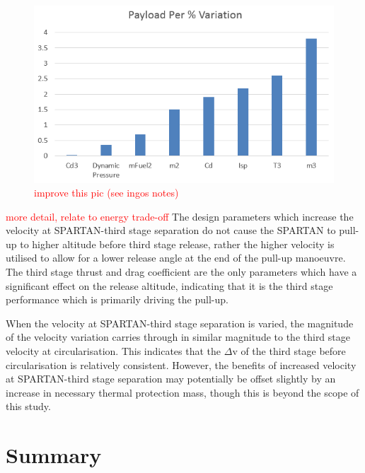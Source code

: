 \begin{figure}[ht!]
\centering
\includegraphics[width=0.7\linewidth]{figures/5_Ascent/BarChartRelativePayloadChange}
\caption{\textcolor{red}{improve this pic (see ingos notes)}}
\label{fig:BarChartRelativePayloadChange}
\end{figure}


\textcolor{red}{more detail, relate to energy trade-off}
The design parameters which increase the velocity at SPARTAN-third stage separation do not cause the SPARTAN to pull-up to higher altitude before third stage release, rather the higher velocity is utilised to allow for a lower release angle at the end of the pull-up manoeuvre. The third stage thrust and drag coefficient are the only parameters which have a significant effect on the release altitude, indicating that it is the third stage performance which is primarily driving the pull-up. 

When the velocity at SPARTAN-third stage separation is varied, the magnitude of the velocity variation carries through in similar magnitude to the third stage velocity at circularisation. This indicates that the $\Delta$v of the third stage before circularisation is relatively consistent. However, the benefits of increased velocity at SPARTAN-third stage separation may potentially be offset slightly by an increase in necessary thermal protection mass, though this is beyond the scope of this study.




\section{Summary}


